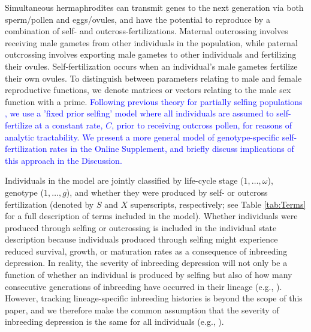 \documentclass[11pt]{article}
\begin{document}
Simultaneous hermaphrodites can transmit genes to the next generation via both sperm/pollen and eggs/ovules, and have the potential to reproduce by a combination of self- and outcross-fertilizations. Maternal outcrossing involves receiving male gametes from other individuals in the population, while paternal outcrossing involves exporting male gametes to other individuals and fertilizing their ovules. Self-fertilization occurs when an individual's male gametes fertilize their own ovules. To distinguish between parameters relating to male and female reproductive functions, we denote matrices or vectors relating to the male sex function with a prime. \textcolor{blue}{Following previous theory for partially selfing populations \cite[e.g.,][]{Charlesworth2010,JordanConnallon2014,Glemin2021}, we use a 'fixed prior selfing' model where all individuals are assumed to self-fertilize at a constant rate, $C$, prior to receiving outcross pollen, for reasons of analytic tractability. We present a more general model of genotype-specific self-fertilization rates in the Online Supplement, and briefly discuss implications of this approach in the Discussion.}

Individuals in the model are jointly classified by life-cycle stage ($1, \ldots, \omega$), genotype ($1, \ldots, g$), and whether they were produced by self- or outcross fertilization (denoted by $S$ and $X$ superscripts, respectively; see Table \ref{tab:Terms} for a full description of terms included in the model). Whether individuals were produced through selfing or outcrossing is included in the individual state description because individuals produced through selfing might experience reduced survival, growth, or maturation rates as a consequence of inbreeding depression. In reality, the severity of inbreeding depression will not only be a function of whether an individual is produced by selfing but also of how many consecutive generations of inbreeding have occurred in their lineage (e.g., \citealt{kelly1999response, kelly2007mutation}). However, tracking lineage-specific inbreeding histories is beyond the scope of this paper, and we therefore make the common assumption that the severity of inbreeding depression is the same for all individuals (e.g., \citealt{Charlesworth1987, Charlesworth2009, Charlesworth2010,JordanConnallon2014}).
\end{document}
